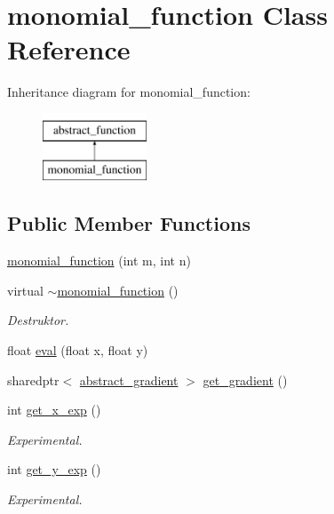\hypertarget{classmonomial__function}{\section{monomial\-\_\-function Class Reference}
\label{classmonomial__function}
}
Inheritance diagram for monomial\-\_\-function\-:\begin{figure}[H]
\begin{center}
\leavevmode
\includegraphics[height=2.000000cm]{classmonomial__function}
\end{center}
\end{figure}
\subsection*{Public Member Functions}
\begin{DoxyCompactItemize}
\item 
\hyperlink{classmonomial__function_a61b1594741e022f6e1f97b8b8df0b776}{monomial\-\_\-function} (int m, int n)
\item 
\hypertarget{classmonomial__function_a761359711793df68bfea7cb75401a088}{virtual \hyperlink{classmonomial__function_a761359711793df68bfea7cb75401a088}{$\sim$monomial\-\_\-function} ()}\label{classmonomial__function_a761359711793df68bfea7cb75401a088}

\begin{DoxyCompactList}\small\item\em Destruktor. \end{DoxyCompactList}\item 
float \hyperlink{classmonomial__function_ac28af6c7f8c7c48216c7bdc270598728}{eval} (float x, float y)
\item 
sharedptr$<$ \hyperlink{classabstract__gradient}{abstract\-\_\-gradient} $>$ \hyperlink{classmonomial__function_a1bb8949943f068e0597c7a8983011d12}{get\-\_\-gradient} ()
\item 
\hypertarget{classmonomial__function_af87735c8ef3441a348e10762efe84b71}{int \hyperlink{classmonomial__function_af87735c8ef3441a348e10762efe84b71}{get\-\_\-x\-\_\-exp} ()}\label{classmonomial__function_af87735c8ef3441a348e10762efe84b71}

\begin{DoxyCompactList}\small\item\em Experimental. \end{DoxyCompactList}\item 
\hypertarget{classmonomial__function_a35d7ae825a7b6d37c644a6670b8c7a23}{int \hyperlink{classmonomial__function_a35d7ae825a7b6d37c644a6670b8c7a23}{get\-\_\-y\-\_\-exp} ()}\label{classmonomial__function_a35d7ae825a7b6d37c644a6670b8c7a23}

\begin{DoxyCompactList}\small\item\em Experimental. \end{DoxyCompactList}\end{DoxyCompactItemize}


